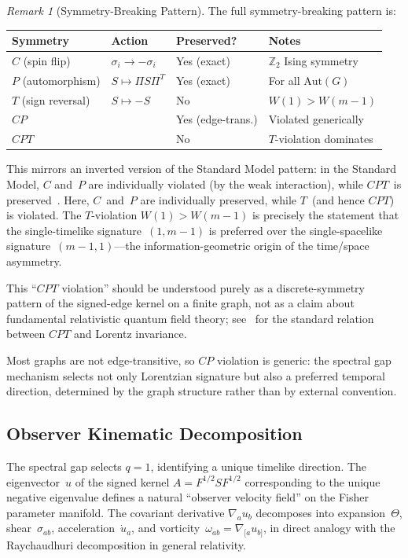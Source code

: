 \documentclass[11pt]{article}
\theoremstyle{definition}
\theoremstyle{remark}
\newtheorem{remark}[theorem]{Remark}
\begin{document}
\begin{remark}[Symmetry-Breaking Pattern]
\label{rem:cpt-summary}
The full symmetry-breaking pattern is:
\begin{center}
\begin{tabular}{llll}
\toprule
Symmetry & Action & Preserved? & Notes \\
\midrule
$C$ (spin flip) & $\sigma_i \to -\sigma_i$ & Yes (exact) & $\mathbb{Z}_2$ Ising symmetry \\
$P$ (automorphism) & $S \mapsto \Pi S \Pi^T$ & Yes (exact) & For all $\mathrm{Aut}(G)$ \\
$T$ (sign reversal) & $S \mapsto -S$ & No & $W(1) > W(m-1)$ \\
$CP$ & & Yes (edge-trans.) & Violated generically \\
$CPT$ & & No & $T$-violation dominates \\
\bottomrule
\end{tabular}
\end{center}
This mirrors an inverted version of the Standard Model pattern: in the Standard
Model, $C$ and~$P$ are individually violated (by the weak interaction), while
$CPT$~is preserved~\cite{Weinberg1995QTF1}. Here, $C$~and~$P$ are individually preserved, while
$T$~(and hence $CPT$) is violated. The $T$-violation
$W(1) > W(m-1)$ is precisely the statement that the single-timelike
signature~$(1, m{-}1)$ is preferred over the single-spacelike
signature~$(m{-}1, 1)$---the information-geometric origin of the
time/space asymmetry.

This ``$CPT$ violation'' should be understood purely as a discrete-symmetry
pattern of the signed-edge kernel on a finite graph, not as a claim about
fundamental relativistic quantum field theory; see~\cite{Greenberg2002} for the
standard relation between $CPT$ and Lorentz invariance.

Most graphs are not edge-transitive, so $CP$ violation is generic:
the spectral gap mechanism selects not only Lorentzian signature but also
a preferred temporal direction, determined by the graph structure rather
than by external convention.
\end{remark}


\subsection{Observer Kinematic Decomposition}
\label{sec:observer-kinematics}

The spectral gap selects $q = 1$, identifying a unique timelike direction.
The eigenvector~$u$ of the signed kernel
$A = F^{1/2} S F^{1/2}$ corresponding to the unique negative eigenvalue
defines a natural ``observer velocity field'' on the Fisher parameter
manifold. The covariant derivative $\nabla_a u_b$ decomposes into
expansion~$\Theta$, shear~$\sigma_{ab}$, acceleration~$\dot{u}_a$,
and vorticity~$\omega_{ab} = \nabla_{[a} u_{b]}$, in direct analogy
with the Raychaudhuri decomposition in general relativity.
\end{document}
